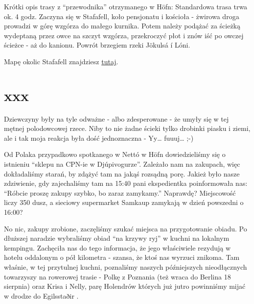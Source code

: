 

Krótki opis trasy z “przewodnika” otrzymanego w Höfn: Standardowa trasa trwa ok. 4 godz. Zaczyna się w Stafafell, koło pensjonatu i kościoła - żwirowa droga prowadzi w górę wzgórza do małego kurnika. Potem należy podążać za ścieżką wydeptaną przez owce na szczyt wzgórza, przekroczyć płot i znów iść po owczej ścieżce - aż do kanionu. Powrót brzegiem rzeki Jökulsá í Lóni.

Mapę okolic Stafafell znajdziesz \href{http://www.stafafell.is/uploads/8/3/3/1/8331287/5674623_orig.jpg}{tutaj}.

\section*{xxx}

Dziewczyny były na tyle odważne - albo zdesperowane - że umyły się w tej mętnej polodowcowej rzece. Niby to nie żadne ścieki tylko drobinki piasku i ziemi, ale i tak moja reakcja była dość jednoznaczna - Yy… fuuuj… ;-)

Od Polaka przypadkowo spotkanego w Nettó w Höfn dowiedzieliśmy się o istnieniu “sklepu na CPN-ie w Djúpivogurze”. Zależało nam na zakupach, więc dokładaliśmy starań, by zdążyć tam na jakąś rozsądną porę. Jakież było nasze zdziwienie, gdy zajechaliśmy tam na 15:40 pani ekspedientka poinformowała nas: “Róbcie proszę zakupy szybko, bo zaraz zamykamy.” Naprawdę? Miejscowość liczy 350 dusz, a sieciowy supermarket Samkaup zamykają w dzień powszedni o 16:00?



No nic, zakupy zrobione, zaczęliśmy szukać miejsca na przygotowanie obiadu. Po dłuższej naradzie wybraliśmy obiad “na krzywy ryj” w kuchni na lokalnym kempingu. Zachęciła nas do tego informacja, że jego właściwiele rezydują w hotelu oddalonym o pół kilometra - szansa, że ktoś nas wyrzuci znikoma. Tam właśnie, w tej przytulnej kuchni, poznaliśmy naszych późniejszych nieodłącznych towarzyszy na rowerowej trasie - Polkę z Poznania (też wraca do Berlina 18 sierpnia) oraz Krisa i Nelly, parę Holendrów których już jutro powinniśmy mijać w drodze do Egilsstaðir .

